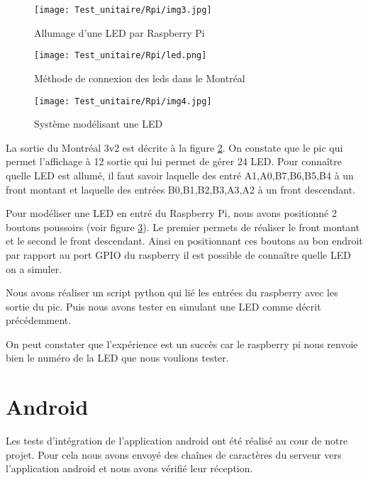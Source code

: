 \begin{figure}[!h]
  \texttt{[image: Test\_unitaire/Rpi/img3.jpg]}
  \caption{Allumage d'une LED par Raspberry Pi}
  \label{figure:led}
\end{figure}

\begin{figure}[!h]
  \centering
  \texttt{[image: Test\_unitaire/Rpi/led.png]}
  \caption{Méthode de connexion des leds dans le Montréal}  
  \label{figure:ledMontreal}
\end{figure}
\begin{figure}[!h]
  \centering
  \texttt{[image: Test\_unitaire/Rpi/img4.jpg]}  
  \caption{Système modélisant une LED}
  \label{figure:test}
\end{figure}

La sortie du Montréal 3v2 est décrite à la figure \ref{figure:ledMontreal}. On constate que le pic qui permet l'affichage à 12 sortie qui lui permet de gérer 24 LED. Pour connaître quelle LED est allumé, il faut savoir laquelle des entré A1,A0,B7,B6,B5,B4 à un front montant et laquelle des entrées B0,B1,B2,B3,A3,A2 à un front descendant.

Pour modéliser une LED en entré du Raspberry Pi, nous avons positionné 2 boutons poussoirs (voir figure \ref{figure:test}). Le premier permets de réaliser le front montant et le second le front descendant. Ainsi en positionnant ces boutons au bon endroit par rapport au port GPIO du raspberry il est possible de connaître quelle LED on a simuler.

Nous avons réaliser un script python qui lié les entrées du raspberry avec les sortie du pic. Puis nous avons tester en simulant une LED comme décrit précédemment.

On peut constater que l'expérience est un succès car le raspberry pi nous renvoie bien le numéro de la LED que nous voulions tester.


\section{Android}

Les tests d'intégration de l'application android ont été réalisé au cour de notre projet. Pour cela nous avons envoyé des chaînes de caractères du serveur vers l'application android et nous avons vérifié leur réception.



